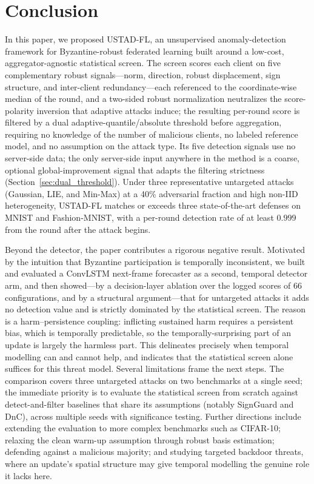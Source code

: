 \documentclass[journal]{IEEEtran}
\begin{document}
\section{Conclusion}
\label{sec:conclusion}

In this paper, we proposed USTAD-FL, an unsupervised anomaly-detection framework for Byzantine-robust federated learning built around a low-cost, aggregator-agnostic statistical screen. The screen scores each client on five complementary robust signals---norm, direction, robust displacement, sign structure, and inter-client redundancy---each referenced to the coordinate-wise median of the round, and a two-sided robust normalization neutralizes the score-polarity inversion that adaptive attacks induce; the resulting per-round score is filtered by a dual adaptive-quantile/absolute threshold before aggregation, requiring no knowledge of the number of malicious clients, no labeled reference model, and no assumption on the attack type. Its five detection signals use no server-side data; the only server-side input anywhere in the method is a coarse, optional global-improvement signal that adapts the filtering strictness (Section~\ref{sec:dual_threshold}). Under three representative untargeted attacks (Gaussian, LIE, and Min-Max) at a 40\% adversarial fraction and high non-IID heterogeneity, USTAD-FL matches or exceeds three state-of-the-art defenses on MNIST and Fashion-MNIST, with a per-round detection rate of at least $0.999$ from the round after the attack begins.

Beyond the detector, the paper contributes a rigorous negative result. Motivated by the intuition that Byzantine participation is temporally inconsistent, we built and evaluated a ConvLSTM next-frame forecaster as a second, temporal detector arm, and then showed---by a decision-layer ablation over the logged scores of $66$ configurations, and by a structural argument---that for untargeted attacks it adds no detection value and is strictly dominated by the statistical screen. The reason is a harm--persistence coupling: inflicting sustained harm requires a persistent bias, which is temporally predictable, so the temporally-surprising part of an update is largely the harmless part. This delineates precisely when temporal modelling can and cannot help, and indicates that the statistical screen alone suffices for this threat model. Several limitations frame the next steps. The comparison covers three untargeted attacks on two benchmarks at a single seed; the immediate priority is to evaluate the statistical screen from scratch against detect-and-filter baselines that share its assumptions (notably SignGuard and DnC), across multiple seeds with significance testing. Further directions include extending the evaluation to more complex benchmarks such as CIFAR-10; relaxing the clean warm-up assumption through robust basis estimation; defending against a malicious majority; and studying targeted backdoor threats, where an update's spatial structure may give temporal modelling the genuine role it lacks here.
\end{document}
